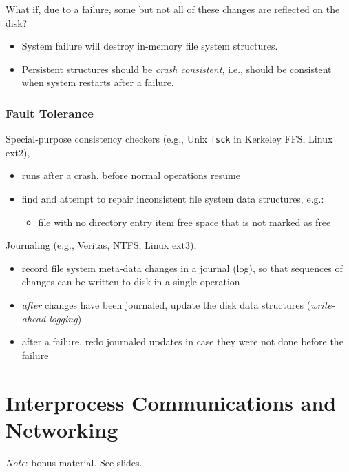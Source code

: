 \documentclass[12pt]{article}
\theoremstyle{plain}
\theoremstyle{definition}
\begin{document}
What if, due to a failure, some but not all of these changes are reflected on the disk?
\begin{itemize}
  \item System failure will destroy in-memory file system structures.
  \item Persistent structures should be \emph{crash consistent}, i.e., should be consistent when system restarts after a failure.
\end{itemize}

\subsubsection{Fault Tolerance}
Special-purpose consistency checkers (e.g., Unix \texttt{fsck} in Kerkeley FFS, Linux ext2),
\begin{itemize}
  \item runs after a crash, before normal operations resume
  \item find and attempt to repair inconsistent file system data structures, e.g.:
  \begin{itemize}
    \item file with no directory entry
    item free space that is not marked as free
  \end{itemize}
\end{itemize}

Journaling (e.g., Veritas, NTFS, Linux ext3),
\begin{itemize}
  \item record file system meta-data changes in a journal (log), so that sequences of changes can be written to disk in a single operation
  \item \emph{after} changes have been journaled, update the disk data structures (\emph{write-ahead logging})
  \item after a failure, redo journaled updates in case they were not done before the failure
\end{itemize}


\newpage
\section{Interprocess Communications and Networking}
\emph{Note}: bonus material. See slides.

\clearpage
\printindex
\end{document}
